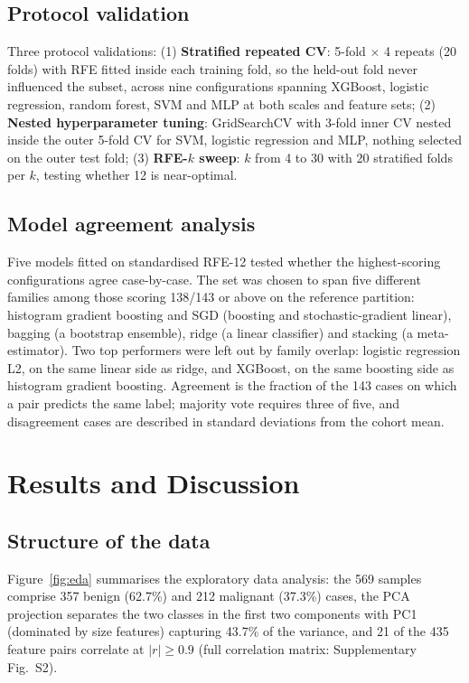 \documentclass[review,12pt]{elsarticle}
\begin{document}
\subsection{Protocol validation}
\label{sec:protocol}

Three protocol validations: (1) \textbf{Stratified repeated CV}: 5-fold $\times$ 4 repeats (20 folds) with RFE fitted inside each training fold, so the held-out fold never influenced the subset, across nine configurations spanning XGBoost, logistic regression, random forest, SVM and MLP at both scales and feature sets; (2) \textbf{Nested hyperparameter tuning}: GridSearchCV with 3-fold inner CV nested inside the outer 5-fold CV for SVM, logistic regression and MLP, nothing selected on the outer test fold; (3) \textbf{RFE-$k$ sweep}: $k$ from 4 to 30 with 20 stratified folds per $k$, testing whether 12 is near-optimal.

\subsection{Model agreement analysis}

Five models fitted on standardised RFE-12 tested whether the highest-scoring configurations agree case-by-case. The set was chosen to span five different families among those scoring 138/143 or above on the reference partition: histogram gradient boosting and SGD (boosting and stochastic-gradient linear), bagging (a bootstrap ensemble), ridge (a linear classifier) and stacking (a meta-estimator). Two top performers were left out by family overlap: logistic regression L2, on the same linear side as ridge, and XGBoost, on the same boosting side as histogram gradient boosting. Agreement is the fraction of the 143 cases on which a pair predicts the same label; majority vote requires three of five, and disagreement cases are described in standard deviations from the cohort mean.

\section{Results and Discussion}
\label{sec:results}

\subsection{Structure of the data}
\label{sec:struct}

Figure~\ref{fig:eda} summarises the exploratory data analysis: the 569 samples comprise 357 benign (62.7\%) and 212 malignant (37.3\%) cases, the PCA projection separates the two classes in the first two components with PC1 (dominated by size features) capturing 43.7\% of the variance, and 21 of the 435 feature pairs correlate at $|r|\ge 0.9$ (full correlation matrix: Supplementary Fig.~S2).
\end{document}
